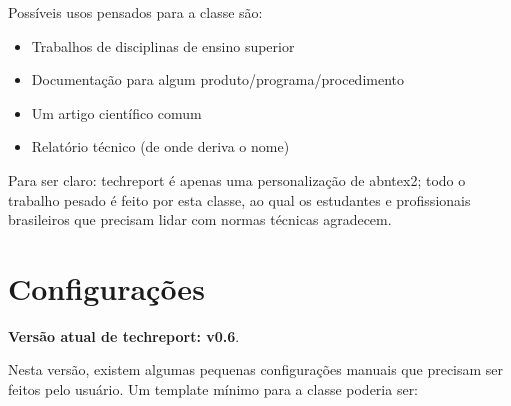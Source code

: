 \documentclass{techreport}
\newcommand{\trep}{\textsf{techreport}}
\begin{document}
Possíveis usos pensados para a classe são:

\begin{itemize}
\item Trabalhos de disciplinas de ensino superior
\item Documentação para algum produto/programa/procedimento
\item Um artigo científico comum
\item Relatório técnico (de onde deriva o nome)
\end{itemize}

Para ser claro: \trep{} é apenas uma personalização de \textsf{abntex2}; todo o trabalho pesado é feito por esta classe, ao qual os estudantes e profissionais brasileiros que precisam lidar com normas técnicas agradecem.

\chapter{Configurações}
\label{sec:configuracoes}

\textbf{Versão atual de techreport: v0.6}.

Nesta versão, existem algumas pequenas configurações manuais que precisam ser feitos pelo usuário. Um template mínimo para a classe poderia ser:
\end{document}
